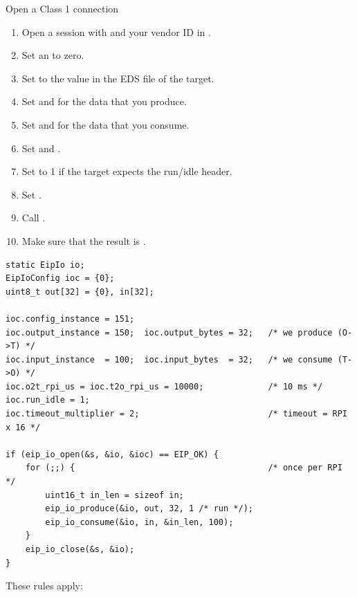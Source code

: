 \begin{procedure}{Open a Class 1 connection}
\begin{enumerate}
  \item Open a session with  and your vendor ID in
        .
  \item Set an  to zero.
  \item Set  to the value in the EDS file of the target.
  \item Set  and  for the data that
        you produce.
  \item Set  and  for the data that
        you consume.
  \item Set  and .
  \item Set  to 1 if the target expects the run/idle header.
  \item Set .
  \item Call .
  \item Make sure that the result is .
\end{enumerate}
\end{procedure}

\begin{lstlisting}
static EipIo io;
EipIoConfig ioc = {0};
uint8_t out[32] = {0}, in[32];

ioc.config_instance = 151;
ioc.output_instance = 150;  ioc.output_bytes = 32;   /* we produce (O->T) */
ioc.input_instance  = 100;  ioc.input_bytes  = 32;   /* we consume (T->O) */
ioc.o2t_rpi_us = ioc.t2o_rpi_us = 10000;             /* 10 ms */
ioc.run_idle = 1;
ioc.timeout_multiplier = 2;                          /* timeout = RPI x 16 */

if (eip_io_open(&s, &io, &ioc) == EIP_OK) {
    for (;;) {                                       /* once per RPI */
        uint16_t in_len = sizeof in;
        eip_io_produce(&io, out, 32, 1 /* run */);
        eip_io_consume(&io, in, &in_len, 100);
    }
    eip_io_close(&s, &io);
}
\end{lstlisting}

These rules apply:

